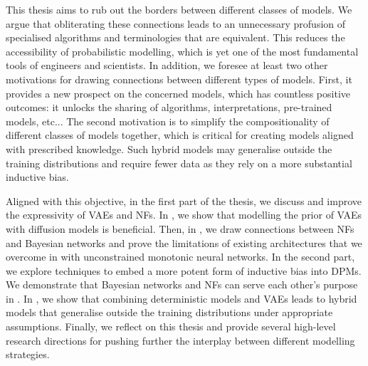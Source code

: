  This thesis aims to rub out the borders between different classes of models. We argue that obliterating these connections leads to an unnecessary profusion of specialised algorithms and terminologies that are equivalent. This reduces the accessibility of probabilistic modelling, which is yet one of the most fundamental tools of engineers and scientists. In addition, we foresee at least two other motivations for drawing connections between different types of models. First, it provides a new prospect on the concerned models, which has countless positive outcomes: it unlocks the sharing of algorithms, interpretations, pre-trained models, etc... The second motivation is to simplify the compositionality of different classes of models together, which is critical for creating models aligned with prescribed knowledge. Such hybrid models may generalise outside the training distributions and require fewer data as they rely on a more substantial inductive bias.

Aligned with this objective, in the first part of the thesis, we discuss and improve the expressivity of VAEs and NFs. In , we show that modelling the prior of VAEs with diffusion models is beneficial. Then, in , we draw connections between NFs and Bayesian networks and prove the limitations of existing architectures that we overcome in  with unconstrained monotonic neural networks. In the second part, we explore techniques to embed a more potent form of inductive bias into DPMs. We demonstrate that Bayesian networks and NFs can serve each other's purpose in . In , we show that combining deterministic models and VAEs leads to hybrid models that generalise outside the training distributions under appropriate assumptions. Finally, we reflect on this thesis and provide several high-level research directions for pushing further the interplay between different modelling strategies.

%
%
